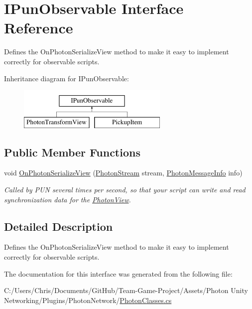\hypertarget{interface_i_pun_observable}{}\section{I\+Pun\+Observable Interface Reference}
\label{interface_i_pun_observable}


Defines the On\+Photon\+Serialize\+View method to make it easy to implement correctly for observable scripts.  


Inheritance diagram for I\+Pun\+Observable\+:\begin{figure}[H]
\begin{center}
\leavevmode
\includegraphics[height=2.000000cm]{interface_i_pun_observable}
\end{center}
\end{figure}
\subsection*{Public Member Functions}
\begin{DoxyCompactItemize}
\item 
void \hyperlink{group__public_api_ga78c69bbb6f79d1e4fb23d3f761eaf4aa}{On\+Photon\+Serialize\+View} (\hyperlink{class_photon_stream}{Photon\+Stream} stream, \hyperlink{class_photon_message_info}{Photon\+Message\+Info} info)
\begin{DoxyCompactList}\small\item\em Called by P\+UN several times per second, so that your script can write and read synchronization data for the \hyperlink{class_photon_view}{Photon\+View}. \end{DoxyCompactList}\end{DoxyCompactItemize}


\subsection{Detailed Description}
Defines the On\+Photon\+Serialize\+View method to make it easy to implement correctly for observable scripts. 



The documentation for this interface was generated from the following file\+:\begin{DoxyCompactItemize}
\item 
C\+:/\+Users/\+Chris/\+Documents/\+Git\+Hub/\+Team-\/\+Game-\/\+Project/\+Assets/\+Photon Unity Networking/\+Plugins/\+Photon\+Network/\hyperlink{_photon_classes_8cs}{Photon\+Classes.\+cs}\end{DoxyCompactItemize}
